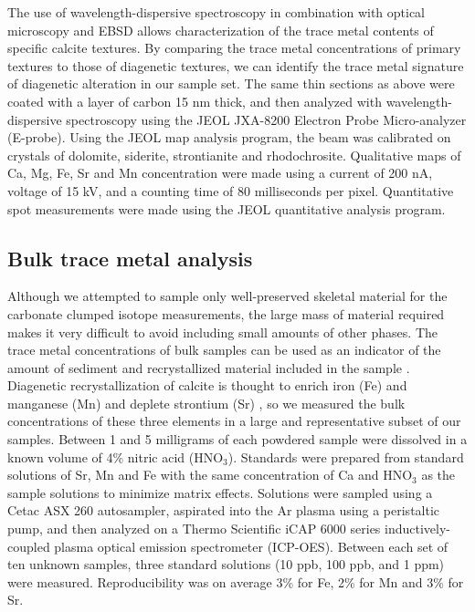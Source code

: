 \documentclass[5p, authoryear]{elsarticle}
\begin{document}
The use of wavelength-dispersive spectroscopy in combination with optical microscopy and EBSD allows characterization of the trace metal contents of specific calcite textures. By comparing the trace metal concentrations of primary textures to those of diagenetic textures, we can identify the trace metal signature of diagenetic alteration in our sample set. The same thin sections as above were coated with a layer of carbon 15 nm thick, and then analyzed with wavelength-dispersive spectroscopy using the JEOL JXA-8200 Electron Probe Micro-analyzer (E-probe). Using the JEOL map analysis program, the beam was calibrated on crystals of dolomite, siderite, strontianite and rhodochrosite. Qualitative maps of Ca, Mg, Fe, Sr and Mn concentration were made using a current of 200 nA, voltage of 15 kV, and a counting time of 80 milliseconds per pixel. Quantitative spot measurements were made using the JEOL quantitative analysis program. 

\subsection{Bulk trace metal analysis}

Although we attempted to sample only well-preserved skeletal material for the carbonate clumped isotope measurements, the large mass of material required makes it very difficult to avoid including small amounts of other phases. The trace metal concentrations of bulk samples can be used as an indicator of the amount of sediment and recrystallized material included in the sample \citep{Azmy1998, Brand2012, Came2007, Finnegan2011}. Diagenetic recrystallization of calcite is thought to enrich iron (Fe) and manganese (Mn) and deplete strontium (Sr) \citep{Brand1980, Shields2003}, so we measured the bulk concentrations of these three elements in a large and representative subset of our samples. Between 1 and 5 milligrams of each powdered sample were dissolved in a known volume of 4\% nitric acid (HNO$_3$). Standards were prepared from standard solutions of Sr, Mn and Fe with the same concentration of Ca and HNO$_3$ as the sample solutions to minimize matrix effects. Solutions were sampled using a Cetac ASX 260 autosampler, aspirated into the Ar plasma using a peristaltic pump, and then analyzed on a Thermo Scientific iCAP 6000 series inductively-coupled plasma optical emission spectrometer (ICP-OES). Between each set of ten unknown samples, three standard solutions (10 ppb, 100 ppb, and 1 ppm) were measured. Reproducibility was on average 3\% for Fe, 2\% for Mn and 3\% for Sr. 
\end{document}
